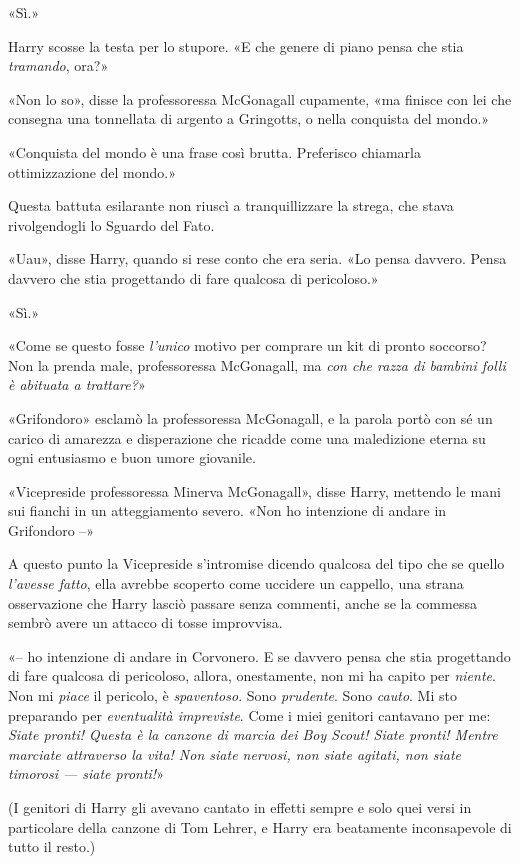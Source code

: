 «Sì.»

Harry scosse la testa per lo stupore. «E che genere di piano pensa che stia \textit{tramando}, ora?»

«Non lo so», disse la professoressa McGonagall cupamente, «ma finisce con lei che consegna una tonnellata di argento a Gringotts, o nella conquista del mondo.»

«Conquista del mondo è una frase così brutta. Preferisco chiamarla ottimizzazione del mondo.»

Questa battuta esilarante non riuscì a tranquillizzare la strega, che stava rivolgendogli lo Sguardo del Fato.

«Uau», disse Harry, quando si rese conto che era seria. «Lo pensa davvero. Pensa davvero che stia progettando di fare qualcosa di pericoloso.»

«Sì.»

«Come se questo fosse \textit{l’unico} motivo per comprare un kit di pronto soccorso? Non la prenda male, professoressa McGonagall, ma \textit{con che razza di bambini folli è abituata a trattare?}»

«Grifondoro» esclamò la professoressa McGonagall, e la parola portò con sé un carico di amarezza e disperazione che ricadde come una maledizione eterna su ogni entusiasmo e buon umore giovanile.

«Vicepreside professoressa Minerva McGonagall», disse Harry, mettendo le mani sui fianchi in un atteggiamento severo. «Non ho intenzione di andare in Grifondoro –»

A questo punto la Vicepreside s’intromise dicendo qualcosa del tipo che se quello \textit{l’avesse fatto}, ella avrebbe scoperto come uccidere un cappello, una strana osservazione che Harry lasciò passare senza commenti, anche se la commessa sembrò avere un attacco di tosse improvvisa.

«– ho intenzione di andare in Corvonero. E se davvero pensa che stia progettando di fare qualcosa di pericoloso, allora, onestamente, non mi ha capito per \textit{niente}. Non mi \textit{piace} il pericolo, è \textit{spaventoso}. Sono \textit{prudente}. Sono \textit{cauto}. Mi sto preparando per \textit{eventualità impreviste}. Come i miei genitori cantavano per me: \textit{Siate pronti! Questa è la canzone di marcia dei Boy Scout! Siate pronti! Mentre marciate attraverso la vita! Non siate nervosi, non siate agitati, non siate timorosi — siate pronti!}»

(I genitori di Harry gli avevano cantato in effetti sempre e solo quei versi in particolare della canzone di Tom Lehrer, e Harry era beatamente inconsapevole di tutto il resto.)

